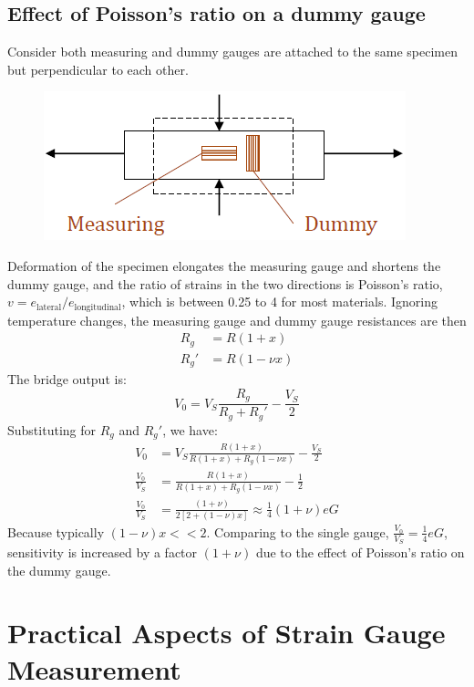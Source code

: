 \documentclass[class=report, crop=false, 12pt,a4paper, tikz, border=4mm]{standalone}
\begin{document}
\subsection{Effect of Poisson's ratio on a dummy gauge}
Consider both measuring and dummy gauges are attached to the same specimen but perpendicular to each other.
\begin{figure}[H]
  \centering
  \includegraphics[width = 0.6 \textwidth]{../img/diagram14.png}
\end{figure}
Deformation of the specimen elongates the measuring gauge and shortens the dummy gauge, and the ratio of strains in the two directions is Poisson's ratio, $v = e_{\textrm{lateral}}/e_{\textrm{longitudinal}}$, which is between 0.25 to 4 for most materials. Ignoring temperature changes, the measuring gauge and dummy gauge resistances are then \begin{align}
  R_g &= R(1+x)\\
  R_g' &= R(1-\nu x)
\end{align}
The bridge output is: 
\begin{equation}
  V_0 = V_S\frac{R_g}{R_g + R_g'} - \frac{V_S}{2}
\end{equation}
Substituting for $R_g$ and $R_g'$, we have:
\begin{align}
  V_0 &= V_S \frac{R(1+x)}{R(1+x) + R_g(1-\nu x)} - \frac{V_S}{2}\\
  \frac{V_0}{V_S} &= \frac{R(1+x)}{R(1+x) + R_g(1-\nu x)} - \frac{1}{2}\\
  \frac{V_0}{V_S} &= \frac{(1+ \nu)}{2[2+ (1-\nu)x]} \approx \frac{1}{4} (1+\nu) eG
\end{align}
Because typically $(1-\nu) x << 2$. Comparing to the single gauge, $\frac{V_0}{V_S} = \frac{1}{4}eG$, sensitivity is increased by a factor $(1+\nu)$ due to the effect of Poisson's ratio on the dummy gauge.
\section{Practical Aspects of Strain Gauge Measurement}
\end{document}
